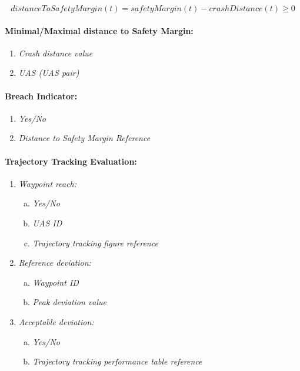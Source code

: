 \begin{equation}
    distanceToSafetyMargin(t) = safetyMargin(t) - crashDistance(t) \ge 0
\end{equation}

\paragraph{Minimal/Maximal distance to Safety Margin:}
\begin{enumerate}
    \item \emph{Crash distance value}
    \item \emph{UAS (UAS pair)}
\end{enumerate}

\paragraph{Breach Indicator:} 
\begin{enumerate}
    \item \emph{Yes/No}
    \item \emph{Distance to Safety Margin Reference}
\end{enumerate}

\paragraph{Trajectory Tracking Evaluation:}

\begin{enumerate}
    \item \emph{Waypoint reach:}
    \begin{enumerate}[a.]
        \item \emph{Yes/No}
        \item \emph{UAS ID}
        \item \emph{Trajectory tracking figure reference}
    \end{enumerate}
    \item \emph{Reference deviation:}
    \begin{enumerate}[a.]
        \item \emph{Waypoint ID}
        \item \emph{Peak deviation value}
    \end{enumerate}
    \item \emph{Acceptable deviation:}
    \begin{enumerate}[a.]
        \item \emph{Yes/No}
        \item \emph{Trajectory tracking performance table reference}
    \end{enumerate}
\end{enumerate}

